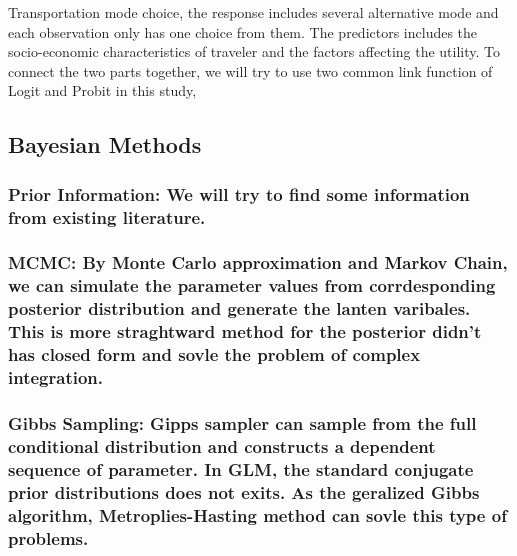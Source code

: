 \documentclass[numbered]{trbunofficial}
\begin{document}
Transportation mode choice, the response includes several alternative mode and each observation only has one choice from them. The predictors includes the socio-economic characteristics of traveler and the factors affecting the utility.
To connect the two parts together, we will try to use two common link function of Logit and Probit in this study,

\hypertarget{bayesian-methods}{%
\subsection{Bayesian Methods}\label{bayesian-methods}}

\hypertarget{prior-information-we-will-try-to-find-some-information-from-existing-literature.}{%
\subsubsection{Prior Information: We will try to find some information from existing literature.}\label{prior-information-we-will-try-to-find-some-information-from-existing-literature.}}

\hypertarget{mcmc-by-monte-carlo-approximation-and-markov-chain-we-can-simulate-the-parameter-values-from-corrdesponding-posterior-distribution-and-generate-the-lanten-varibales.-this-is-more-straghtward-method-for-the-posterior-didnt-has-closed-form-and-sovle-the-problem-of-complex-integration.}{%
\subsubsection{MCMC: By Monte Carlo approximation and Markov Chain, we can simulate the parameter values from corrdesponding posterior distribution and generate the lanten varibales. This is more straghtward method for the posterior didn't has closed form and sovle the problem of complex integration.}\label{mcmc-by-monte-carlo-approximation-and-markov-chain-we-can-simulate-the-parameter-values-from-corrdesponding-posterior-distribution-and-generate-the-lanten-varibales.-this-is-more-straghtward-method-for-the-posterior-didnt-has-closed-form-and-sovle-the-problem-of-complex-integration.}}

\hypertarget{gibbs-sampling-gipps-sampler-can-sample-from-the-full-conditional-distribution-and-constructs-a-dependent-sequence-of-parameter.-in-glm-the-standard-conjugate-prior-distributions-does-not-exits.-as-the-geralized-gibbs-algorithm-metroplies-hasting-method-can-sovle-this-type-of-problems.}{%
\subsubsection{Gibbs Sampling: Gipps sampler can sample from the full conditional distribution and constructs a dependent sequence of parameter. In GLM, the standard conjugate prior distributions does not exits. As the geralized Gibbs algorithm, Metroplies-Hasting method can sovle this type of problems.}\label{gibbs-sampling-gipps-sampler-can-sample-from-the-full-conditional-distribution-and-constructs-a-dependent-sequence-of-parameter.-in-glm-the-standard-conjugate-prior-distributions-does-not-exits.-as-the-geralized-gibbs-algorithm-metroplies-hasting-method-can-sovle-this-type-of-problems.}}
\end{document}
